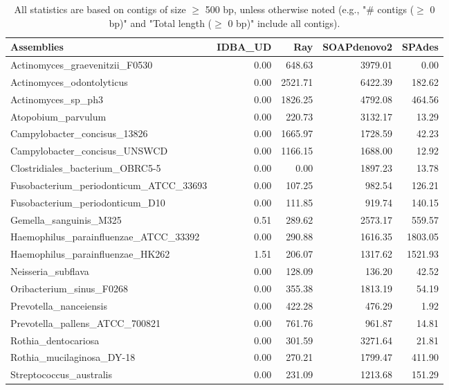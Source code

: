 \documentclass[12pt,a4paper]{article}
\begin{document}
\begin{table}[ht]
\begin{center}
\caption{All statistics are based on contigs of size $\geq$ 500 bp, unless otherwise noted (e.g., "\# contigs ($\geq$ 0 bp)" and "Total length ($\geq$ 0 bp)" include all contigs).}
\begin{tabular}{|l*{4}{|r}|}
\hline
Assemblies & IDBA\_UD & Ray & SOAPdenovo2 & SPAdes \\ \hline
Actinomyces\_graevenitzii\_F0530 & 0.00 & 648.63 & 3979.01 & 0.00 \\ \hline
Actinomyces\_odontolyticus & 0.00 & 2521.71 & 6422.39 & 182.62 \\ \hline
Actinomyces\_sp\_ph3 & 0.00 & 1826.25 & 4792.08 & 464.56 \\ \hline
Atopobium\_parvulum & 0.00 & 220.73 & 3132.17 & 13.29 \\ \hline
Campylobacter\_concisus\_13826 & 0.00 & 1665.97 & 1728.59 & 42.23 \\ \hline
Campylobacter\_concisus\_UNSWCD & 0.00 & 1166.15 & 1688.00 & 12.92 \\ \hline
Clostridiales\_bacterium\_OBRC5-5 & 0.00 & 0.00 & 1897.23 & 13.78 \\ \hline
Fusobacterium\_periodonticum\_ATCC\_33693 & 0.00 & 107.25 & 982.54 & 126.21 \\ \hline
Fusobacterium\_periodonticum\_D10 & 0.00 & 111.85 & 919.74 & 140.15 \\ \hline
Gemella\_sanguinis\_M325 & 0.51 & 289.62 & 2573.17 & 559.57 \\ \hline
Haemophilus\_parainfluenzae\_ATCC\_33392 & 0.00 & 290.88 & 1616.35 & 1803.05 \\ \hline
Haemophilus\_parainfluenzae\_HK262 & 1.51 & 206.07 & 1317.62 & 1521.93 \\ \hline
Neisseria\_subflava & 0.00 & 128.09 & 136.20 & 42.52 \\ \hline
Oribacterium\_sinus\_F0268 & 0.00 & 355.38 & 1813.19 & 54.19 \\ \hline
Prevotella\_nanceiensis & 0.00 & 422.28 & 476.29 & 1.92 \\ \hline
Prevotella\_pallens\_ATCC\_700821 & 0.00 & 761.76 & 961.87 & 14.81 \\ \hline
Rothia\_dentocariosa & 0.00 & 301.59 & 3271.64 & 21.81 \\ \hline
Rothia\_mucilaginosa\_DY-18 & 0.00 & 270.21 & 1799.47 & 411.90 \\ \hline
Streptococcus\_australis & 0.00 & 231.09 & 1213.68 & 151.29 \\ \hline

\end{tabular}
\end{center}
\end{table}
\end{document}
